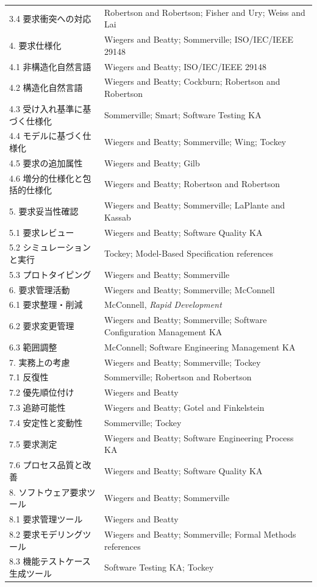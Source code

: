 \documentclass[a4paper,11pt]{ltjsarticle}
\numberwithin{figure}{section}
\numberwithin{table}{section}
\begin{document}
\begin{longtable}{@{}p{.38\linewidth}p{.55\linewidth}@{}}
3.4 要求衝突への対応 & Robertson and Robertson; Fisher and Ury; Weiss and Lai \\
4. 要求仕様化 & Wiegers and Beatty; Sommerville; ISO/IEC/IEEE 29148 \\
4.1 非構造化自然言語 & Wiegers and Beatty; ISO/IEC/IEEE 29148 \\
4.2 構造化自然言語 & Wiegers and Beatty; Cockburn; Robertson and Robertson \\
4.3 受け入れ基準に基づく仕様化 & Sommerville; Smart; Software Testing KA \\
4.4 モデルに基づく仕様化 & Wiegers and Beatty; Sommerville; Wing; Tockey \\
4.5 要求の追加属性 & Wiegers and Beatty; Gilb \\
4.6 増分的仕様化と包括的仕様化 & Wiegers and Beatty; Robertson and Robertson \\
5. 要求妥当性確認 & Wiegers and Beatty; Sommerville; LaPlante and Kassab \\
5.1 要求レビュー & Wiegers and Beatty; Software Quality KA \\
5.2 シミュレーションと実行 & Tockey; Model-Based Specification references \\
5.3 プロトタイピング & Wiegers and Beatty; Sommerville \\
6. 要求管理活動 & Wiegers and Beatty; Sommerville; McConnell \\
6.1 要求整理・削減 & McConnell, \textit{Rapid Development} \\
6.2 要求変更管理 & Wiegers and Beatty; Sommerville; Software Configuration Management KA \\
6.3 範囲調整 & McConnell; Software Engineering Management KA \\
7. 実務上の考慮 & Wiegers and Beatty; Sommerville; Tockey \\
7.1 反復性 & Sommerville; Robertson and Robertson \\
7.2 優先順位付け & Wiegers and Beatty \\
7.3 追跡可能性 & Wiegers and Beatty; Gotel and Finkelstein \\
7.4 安定性と変動性 & Sommerville; Tockey \\
7.5 要求測定 & Wiegers and Beatty; Software Engineering Process KA \\
7.6 プロセス品質と改善 & Wiegers and Beatty; Software Quality KA \\
8. ソフトウェア要求ツール & Wiegers and Beatty; Sommerville \\
8.1 要求管理ツール & Wiegers and Beatty \\
8.2 要求モデリングツール & Wiegers and Beatty; Sommerville; Formal Methods references \\
8.3 機能テストケース生成ツール & Software Testing KA; Tockey \\
\bottomrule
\end{longtable}
\normalsize
\end{document}
